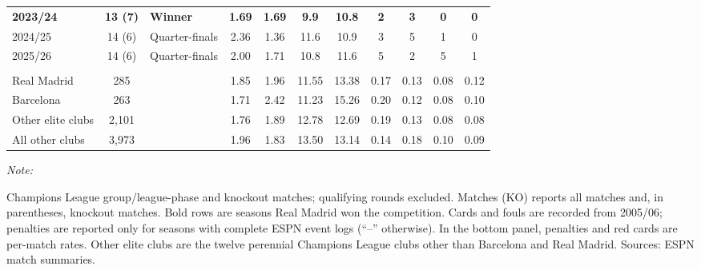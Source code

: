 \begin{table}[!h]
{\begin{threeparttable}
\begin{tabular}[t]{lclcccccccc}
\textbf{\hspace{1em}2023/24} & \textbf{13 (7)} & \textbf{Winner} & \textbf{1.69} & \textbf{1.69} & \textbf{9.9} & \textbf{10.8} & \textbf{2} & \textbf{3} & \textbf{0} & \textbf{0}\\
\hspace{1em}2024/25 & 14 (6) & Quarter-finals & 2.36 & 1.36 & 11.6 & 10.9 & 3 & 5 & 1 & 0\\
\hspace{1em}2025/26 & 14 (6) & Quarter-finals & 2.00 & 1.71 & 10.8 & 11.6 & 5 & 2 & 5 & 1\\
\addlinespace[0.3em]
\multicolumn{11}{l}{\textbf{Per-match averages, all seasons}}\\
\hspace{1em}Real Madrid & 285 &  & 1.85 & 1.96 & 11.55 & 13.38 & 0.17 & 0.13 & 0.08 & 0.12\\
\hspace{1em}Barcelona & 263 &  & 1.71 & 2.42 & 11.23 & 15.26 & 0.20 & 0.12 & 0.08 & 0.10\\
\hspace{1em}Other elite clubs & 2,101 &  & 1.76 & 1.89 & 12.78 & 12.69 & 0.19 & 0.13 & 0.08 & 0.08\\
\hspace{1em}All other clubs & 3,973 &  & 1.96 & 1.83 & 13.50 & 13.14 & 0.14 & 0.18 & 0.10 & 0.09\\
\bottomrule
\end{tabular}
\begin{tablenotes}[para]
\item \textit{Note: } 
\item Champions League group/league-phase and knockout matches; qualifying rounds excluded. Matches (KO) reports all matches and, in parentheses, knockout matches. Bold rows are seasons Real Madrid won the competition. Cards and fouls are recorded from 2005/06; penalties are reported only for seasons with complete ESPN event logs (``--'' otherwise). In the bottom panel, penalties and red cards are per-match rates. Other elite clubs are the twelve perennial Champions League clubs other than Barcelona and Real Madrid. Sources: ESPN match summaries.
\end{tablenotes}
\end{threeparttable}}
\end{table}
